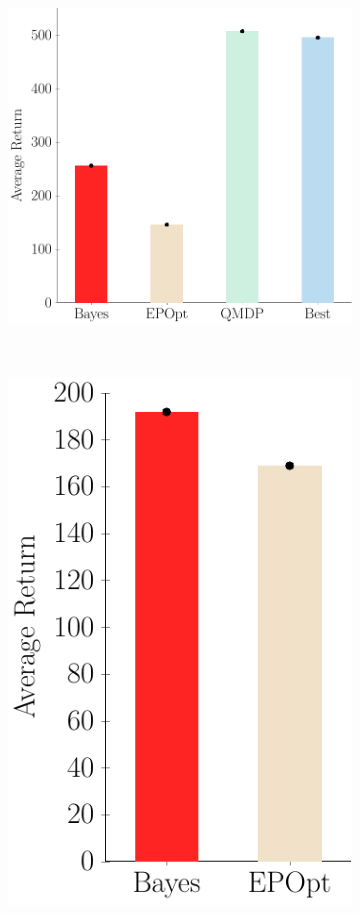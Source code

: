 \documentclass{article}
\begin{document}
\begin{figure}[t!]
\begin{centering}
\begin{subfigure}[b]{0.24\columnwidth}
\includegraphics[width=\linewidth]{figs/cheetah_env_comparison.pdf}
\end{subfigure}
~
\begin{subfigure}[b]{0.22\columnwidth}
\includegraphics[width=\linewidth]{figs/cheetah_average.pdf}

\end{subfigure}
\end{centering}
\end{figure}
\end{document}
